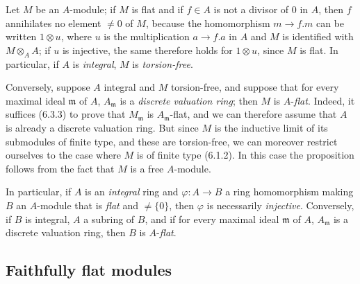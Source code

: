 \begin{env}[6.3.4]
\label{0.6.3.4}
Let $M$ be an $A$-module; if $M$ is flat and if $f\in A$ is not a divisor
of $0$ in $A$, then $f$ annihilates no element $\neq0$ of $M$, because
the homomorphism $m\to f.m$ can be written $1\otimes u$, where $u$ is the
multiplication $a\to f.a$ in $A$ and $M$ is identified with
$M\otimes_A A$; if $u$ is injective, the same therefore holds for
$1\otimes u$, since $M$ is flat. In particular, if $A$ is
\emph{integral}, $M$ is \emph{torsion-free}.

Conversely, suppose $A$ integral and $M$ torsion-free, and suppose that for
every maximal ideal $\mathfrak{m}$ of $A$, $A_\mathfrak{m}$ is a
\emph{discrete valuation ring}; then $M$ is $A$-\emph{flat}. Indeed, it suffices
(6.3.3) to prove that $M_\mathfrak{m}$ is $A_\mathfrak{m}$-flat, and
we can therefore assume that $A$ is already a discrete valuation ring. But
since $M$ is the inductive limit of its submodules of finite type, and these
are torsion-free, we can moreover restrict ourselves to the case where $M$ is of
finite type (6.1.2). In this case the proposition follows from the fact that $M$ is a
free $A$-module.

In particular, if $A$ is an \emph{integral} ring and
$\varphi:A\to B$ a ring homomorphism making $B$ an $A$-module that is
\emph{flat} and $\neq\{0\}$, then $\varphi$ is necessarily \emph{injective}.
Conversely, if $B$ is integral, $A$ a subring of $B$, and if for every
maximal ideal $\mathfrak{m}$ of $A$, $A_\mathfrak{m}$ is a discrete
valuation ring, then $B$ is $A$-\emph{flat}.
\end{env}

\subsection{Faithfully flat modules}
\label{subsection:0.6.4}

